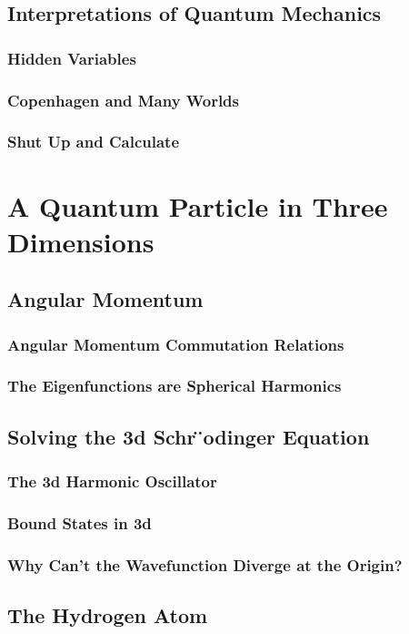 \documentclass{book}
\begin{document}
\section{Interpretations of Quantum Mechanics}
\subsection{Hidden Variables}
\subsection{Copenhagen and Many Worlds}
\subsection{Shut Up and Calculate}
\chapter{A Quantum Particle in Three Dimensions}
\section{Angular Momentum}
\subsection{Angular Momentum Commutation Relations }
\subsection{The Eigenfunctions are Spherical Harmonics}
\section{Solving the 3d Schr ̈odinger Equation}
\subsection{The 3d Harmonic Oscillator}
\subsection{Bound States in 3d}
\subsection{Why Can’t the Wavefunction Diverge at the Origin?}
\section{The Hydrogen Atom}
\end{document}
